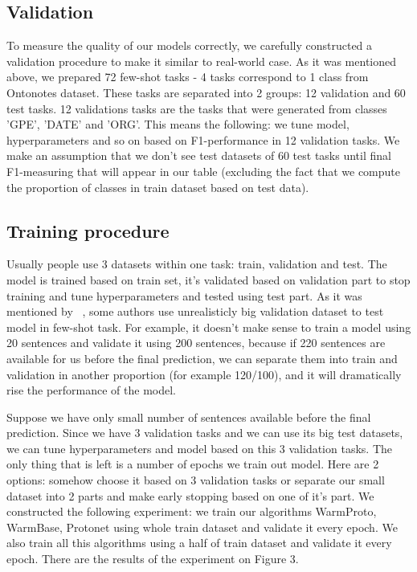 \subsection{Validation} 
To measure the quality of our models correctly, we carefully constructed a validation procedure to make it similar to real-world case. As it was mentioned above, we prepared 72 few-shot tasks - 4 tasks correspond to 1 class from Ontonotes dataset. These tasks are separated into 2 groups: 12 validation and 60 test tasks. 12 validations tasks are the tasks that were generated from classes 'GPE', 'DATE' and 'ORG'. This means the following: we tune model, hyperparameters and so on based on F1-performance in 12 validation tasks. We make an assumption that we don't see test datasets of 60 test tasks until final F1-measuring that will appear in our table (excluding the fact that we compute the proportion of classes in train dataset based on test data). 

\subsection{Training procedure} 
Usually people use 3 datasets within one task: train, validation and test. The model is trained based on train set, it's validated based on validation part to stop training and tune hyperparameters and tested using test part.
As it was mentioned by ~\cite{realeval}, some authors use unrealisticly big validation dataset to test model in few-shot task. For example, it doesn't make sense to train a model using 20 sentences and validate it using 200 sentences, because if 220 sentences are available for us before the final prediction, we can separate them into train and validation in another proportion (for example 120/100), and it will dramatically rise the performance of the model. 

Suppose we have only small number of sentences available before the final prediction. Since we have 3 validation tasks and we can use its big test datasets, we can tune hyperparameters and model based on this 3 validation tasks. The only thing that is left is a number of epochs we train out model. Here are 2 options: somehow choose it based on 3 validation tasks or separate our small dataset into 2 parts and make early stopping based on one of it's part. 
We constructed the following experiment: we train our algorithms WarmProto, WarmBase, Protonet using whole train dataset and validate it every epoch. We also train all this algorithms using a half of train dataset and validate it every epoch. There are the results of the experiment on Figure 3. 


